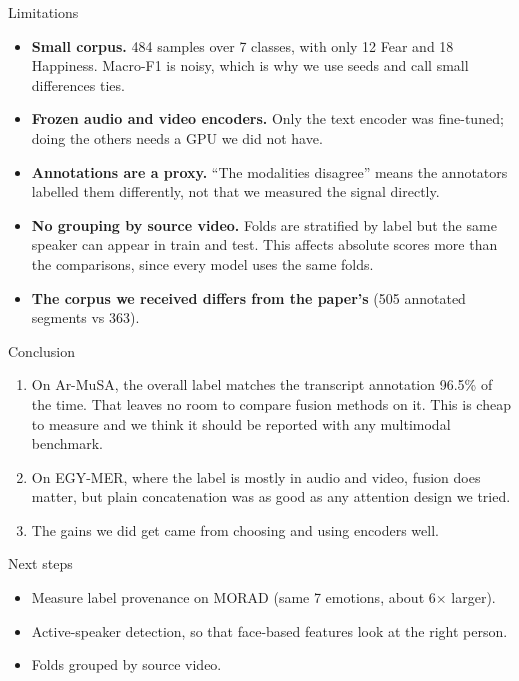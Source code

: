 \documentclass[aspectratio=169,10pt]{beamer}
\begin{document}
\begin{frame}[t]{Limitations}
\begin{itemize}
\item \textbf{Small corpus.} 484 samples over 7 classes, with only 12 Fear and 18
      Happiness. Macro-F1 is noisy, which is why we use seeds and call small differences ties.
\item \textbf{Frozen audio and video encoders.} Only the text encoder was fine-tuned;
      doing the others needs a GPU we did not have.
\item \textbf{Annotations are a proxy.} ``The modalities disagree'' means the annotators
      labelled them differently, not that we measured the signal directly.
\item \textbf{No grouping by source video.} Folds are stratified by label but the same
      speaker can appear in train and test. This affects absolute scores more than the
      comparisons, since every model uses the same folds.
\item \textbf{The corpus we received differs from the paper's} (505 annotated segments vs 363).
\end{itemize}
\end{frame}

\begin{frame}[t]{Conclusion}
\begin{enumerate}
\item On Ar-MuSA, the overall label matches the transcript annotation 96.5\% of the time.
      That leaves no room to compare fusion methods on it. This is cheap to measure
      and we think it should be reported with any multimodal benchmark.
\item On EGY-MER, where the label is mostly in audio and video, fusion does matter,
      but plain concatenation was as good as any attention design we tried.
\item The gains we did get came from choosing and using encoders well.
\end{enumerate}

\vspace{0.4cm}
\begin{block}{Next steps}
\begin{itemize}
\item Measure label provenance on MORAD (same 7 emotions, about 6$\times$ larger).
\item Active-speaker detection, so that face-based features look at the right person.
\item Folds grouped by source video.
\end{itemize}
\end{block}
\end{frame}
\end{document}
